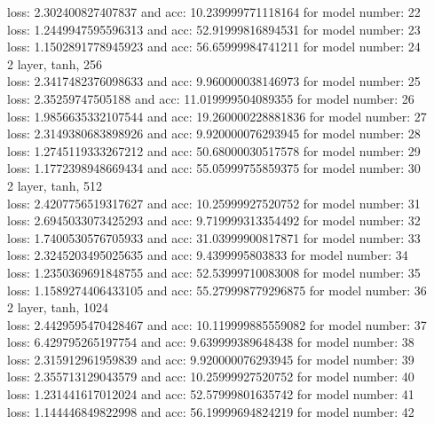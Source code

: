 \documentclass{article}
\begin{document}
loss: 2.302400827407837 and acc: 10.239999771118164 for model number: 22 \\
loss: 1.2449947595596313 and acc: 52.91999816894531 for model number: 23 \\
loss: 1.1502891778945923 and acc: 56.65999984741211 for model number: 24 \\
2 layer, tanh, 256 \\
loss: 2.3417482376098633 and acc: 9.960000038146973 for model number: 25 \\
loss: 2.35259747505188 and acc: 11.019999504089355 for model number: 26 \\
loss: 1.9856635332107544 and acc: 19.260000228881836 for model number: 27 \\
loss: 2.3149380683898926 and acc: 9.920000076293945 for model number: 28 \\
loss: 1.2745119333267212 and acc: 50.68000030517578 for model number: 29 \\
loss: 1.1772398948669434 and acc: 55.05999755859375 for model number: 30 \\
2 layer, tanh, 512 \\
loss: 2.4207756519317627 and acc: 10.25999927520752 for model number: 31 \\
loss: 2.6945033073425293 and acc: 9.719999313354492 for model number: 32 \\
loss: 1.7400530576705933 and acc: 31.03999900817871 for model number: 33 \\
loss: 2.3245203495025635 and acc: 9.4399995803833 for model number: 34 \\
loss: 1.2350369691848755 and acc: 52.53999710083008 for model number: 35 \\
loss: 1.1589274406433105 and acc: 55.279998779296875 for model number: 36 \\
2 layer, tanh, 1024 \\
loss: 2.4429595470428467 and acc: 10.119999885559082 for model number: 37 \\
loss: 6.429795265197754 and acc: 9.639999389648438 for model number: 38 \\
loss: 2.315912961959839 and acc: 9.920000076293945 for model number: 39 \\
loss: 2.355713129043579 and acc: 10.25999927520752 for model number: 40 \\
loss: 1.231441617012024 and acc: 52.57999801635742 for model number: 41 \\
loss: 1.144446849822998 and acc: 56.19999694824219 for model number: 42 \\
\end{document}
